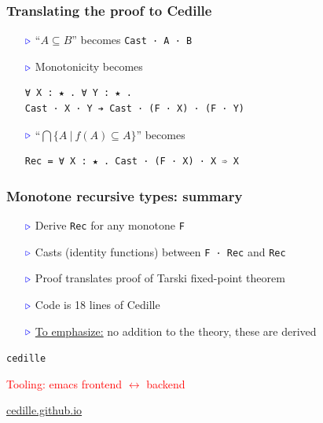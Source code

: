 \documentclass[11pt]{beamer}
\newcommand{\myb}[0]{\ensuremath{\textcolor{blue}{\triangleright}}}
\begin{document}
\begin{frame}[containsverbatim]
  \frametitle{Translating the proof to Cedille}

  \begin{itemize}
  \item[$\myb$] ``$A \subseteq B$'' becomes \verb|Cast · A · B|

    \vspace{.75cm}

  \item[$\myb$] Monotonicity becomes

    {\footnotesize
\begin{verbatim}
∀ X : ★ . ∀ Y : ★ . 
Cast · X · Y ➔ Cast · (F · X) · (F · Y) 
\end{verbatim}
}

    \vspace{.75cm}

  \item[$\myb$] ``$\bigcap\{ A\ |\ f(A) \subseteq A\}$'' becomes

{\footnotesize
\begin{verbatim}
Rec = ∀ X : ★ . Cast · (F · X) · X ➾ X 
\end{verbatim}
}

\end{itemize}
\end{frame}

\begin{frame}[containsverbatim]
  \frametitle{Monotone recursive types: summary}

  \begin{itemize}
  \item[$\myb$] Derive \verb|Rec| for any monotone \verb|F|
    \item[$\myb$] Casts (identity functions) between \verb|F · Rec| and \verb|Rec|
    \item[$\myb$] Proof translates proof of Tarski fixed-point theorem
    \item[$\myb$] Code is 18 lines of Cedille
\item[$\myb$] \underline{To emphasize:} no addition to the theory, these are derived
      \end{itemize}
\end{frame}

\begin{frame}
\begin{center}
{  \Huge
\texttt{cedille}}

  \vspace{1cm}

{\Large
  \textcolor{red}{Tooling: emacs frontend $\leftrightarrow$ backend}

  \vspace{3cm}

  \url{cedille.github.io}
}
  \end{center}

\end{frame}
\end{document}
